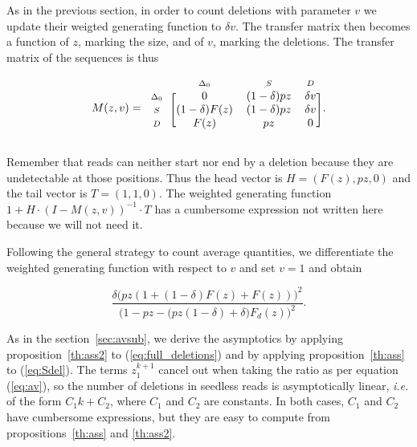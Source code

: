 \documentclass{article}
\newcommand{\smD}{\scriptstyle{D}}
\newcommand{\smS}{\scriptstyle{S}}
\newcommand{\smDELz}{\scriptstyle{\Delta_0}}
\begin{document}
As in the previous section, in order to count deletions with parameter $v$
we update their weigted generating function to $\delta v$. The transfer
matrix then becomes a function of $z$, marking the size, and of $v$,
marking the deletions. The transfer matrix of the sequences is thus


\begin{equation*}
M(z,v) = 
\begin{blockarray}{cccc}
       & \smDELz & \smS & \smD \\
\begin{block}{c[ccc]}
\smDELz & 0              & (1-\delta)pz & \delta v \\
\smS    & (1-\delta)F(z) & (1-\delta)pz & \delta v \\
\smD    & F(z)           & pz           & 0        \\
\end{block}
\end{blockarray}.
\end{equation*}

Remember that reads can neither start nor end by a deletion because they
are undetectable at those positions. Thus the head vector is $H = (F(z),
pz, 0)$ and the tail vector is $T = (1,1,0)$. The weighted generating
function $1+H \cdot (I-M(z,v))^{-1} \cdot T$ has a cumbersome expression
not written here because we will not need it.

Following the general strategy to count average quantities, we
differentiate the weighted generating function with respect to $v$ and
set $v=1$ and obtain

\begin{equation}
\label{eq:full_deletions}
\frac{\delta\big( pz(1+(1-\delta)F(z)+F(z)) \big)^2}
{\big( 1-pz - \big(pz(1-\delta) + \delta\big)F_d(z) \big)^2}.
\end{equation}

As in the section~\ref{sec:avsub}, we derive the asymptotics by applying
proposition~\ref{th:ass2} to (\ref{eq:full_deletions}) and by applying
proposition~\ref{th:ass} to (\ref{eq:Sdel}). The terms $z_1^{k+1}$ cancel
out when taking the ratio as per equation (\ref{eq:av}), so the number of
deletions in seedless reads is asymptotically linear, \textit{i.e.} of the
form $C_1k+C_2$, where $C_1$ and $C_2$ are constants. In both cases, $C_1$
and $C_2$ have cumbersome expressions, but they are easy to compute from
propositions~\ref{th:ass} and \ref{th:ass2}.
\end{document}
